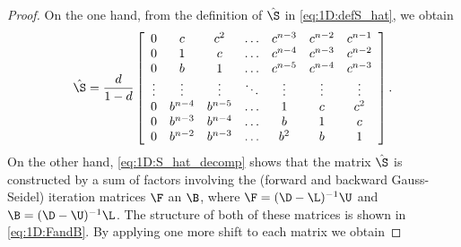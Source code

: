 \begin{proof}
On the one hand, from the definition of $\hat{\S}$ in \eqref{eq:1D:defS_hat}, we
obtain
\begin{equation*}
\hat{\S}= \frac{d}{1-d}
\left[
\begin{array}{ccccccc}
0       & c       & c^2     & \hdots  & c^{n-3} & c^{n-2} & c^{n-1} \\
0       & 1       & c       & \hdots  & c^{n-4} & c^{n-3} & c^{n-2} \\
0       & b       & 1       & \hdots  & c^{n-5} & c^{n-4} & c^{n-3} \\
\vdots  & \vdots  & \vdots  & \ddots  & \vdots  & \vdots  & \vdots  \\
0       & b^{n-4} & b^{n-5} & \hdots  & 1       & c       & c^2     \\
0       & b^{n-3} & b^{n-4} & \hdots  & b       & 1       & c       \\
0       & b^{n-2} & b^{n-3} & \hdots  & b^2     & b       & 1       \\
\end{array}
\right].
\end{equation*}
On the other hand, \eqref{eq:1D:S_hat_decomp} shows that the matrix $\hat{\S}$ is
constructed by a sum of factors involving the (forward and backward
Gauss-Seidel) iteration matrices $\F$ an $\B$, where $\F=(\D-\L)^{-1}\U$ and
$\B=(\D-\U)^{-1}\L$. The structure of both of these matrices is shown in
\eqref{eq:1D:FandB}. By applying one more shift to each matrix we obtain
%


\end{proof}
